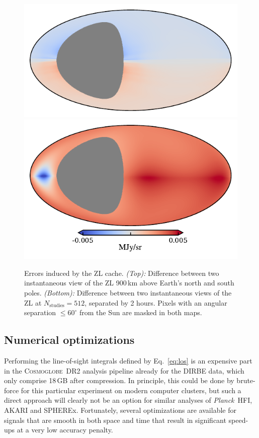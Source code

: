 \documentclass[twocolumn]{aa}
\def\Planck{\textit{Planck}}
\newcommand{\cosmoglobe}{\textsc{Cosmoglobe}}
\begin{document}
\begin{figure}
    \includegraphics[width=\columnwidth]{figs/cache_error_delta_t.pdf}\\
    \includegraphics[width=\columnwidth]{figs/cache_error_z.pdf}
    \caption{Errors induced by the ZL cache. \textit{(Top):} Difference between two 
    instantaneous view of the ZL 900\,km above Earth's north and south 
    poles. \textit{(Bottom):} Difference between two instantaneous views of the ZL at $N_\mathrm{studies}=512$, 
    separated by 2 hours. Pixels with an angular separation $\leq 60^\circ$ from the Sun 
    are masked in both maps.}
    \label{fig:cache-error}
\end{figure}



\subsection{Numerical optimizations}\label{sect:optimization}
Performing the line-of-sight integrals defined by Eq.~\eqref{eq:los}
is an expensive part in the \cosmoglobe\ DR2 analysis pipeline already
for the DIRBE data, which only comprise 18\,GB after compression. In
principle, this could be done by brute-force for this particular
experiment on modern computer clusters, but such a direct approach
will clearly not be an option for similar analyses of \Planck\ HFI,
AKARI and SPHEREx. Fortunately, several optimizations are available
for signals that are smooth in both space and time that result in
significant speed-ups at a very low accuracy penalty.
\end{document}
